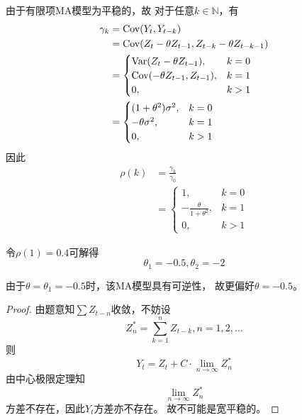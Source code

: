 \documentclass[cn]{homework}
\begin{document}
    \problem
    \begin{subproblem}[(\alph*)]
        \item\label{pb:acf}
        由于有限项MA模型为平稳的，故
        对于任意$k\in\mathbb N$，有
        \[\begin{aligned}
            \gamma_k&=\mathrm{Cov}(Y_t,Y_{t-k})\\
                    &=\mathrm{Cov}(Z_t-\theta Z_{t-1},Z_{t-k}-\theta Z_{t-k-1})\\
                    &=\begin{cases}
                        \mathrm{Var}(Z_t-\theta Z_{t-1}),&k=0\\
                        \mathrm{Cov}(-\theta Z_{t-1},Z_{t-1}),&k=1\\
                        0,&k>1
                    \end{cases}\\
                    &=\begin{cases}
                        (1+\theta^2)\sigma^2,&k=0\\
                        -\theta\sigma^2,&k=1\\
                        0,&k>1
                    \end{cases}
        \end{aligned}\]
        因此
        \[\begin{aligned}
            \rho(k)&=\frac{\gamma_k}{\gamma_0}\\
                   &=\begin{cases}
                        1,&k=0\\
                        -\frac{\theta}{1+\theta^2},&k=1\\
                        0,&k>1
                   \end{cases}
        \end{aligned}\]

        \item
        令$\rho(1)=0.4$可解得
        \[\theta_1=-0.5,\theta_2=-2\]

        由于$\theta=\theta_1=-0.5$时，该MA模型具有可逆性，
        故更偏好$\theta=-0.5$。

        \item
        \begin{proof}
            由题意知$\sum Z_{t-n}$收敛，不妨设
            \[Z^*_n=\sum_{k=1}^nZ_{t-k},n=1,2,\ldots\]
            则
            \begin{equation}
                \label{eq:partial sum}
                Y_t=Z_t+C\cdot\lim_{n\to\infty}Z^*_n
            \end{equation}
            由中心极限定理知
            \[\lim_{n\to\infty}Z^*_n\]
            方差不存在，因此$Y_t$方差亦不存在。
            故不可能是宽平稳的。
        \end{proof}


\end{subproblem}
\end{document}
